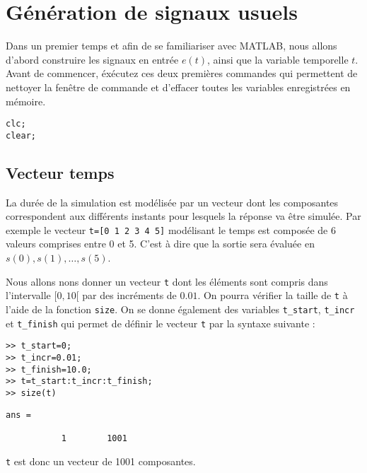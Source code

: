 \section{Génération de signaux usuels}
Dans un premier temps et afin de se familiariser avec MATLAB, nous 
allons d'abord construire les signaux en entrée $e(t)$, 
ainsi que la variable temporelle $t$.
Avant de commencer, éxécutez ces deux premières commandes qui permettent de 
nettoyer la fenêtre de commande et d'effacer toutes les variables 
enregistrées en mémoire.
\begin{verbatim}
clc;
clear;
\end{verbatim}
\subsection{Vecteur temps}
La durée de la simulation est modélisée par un vecteur dont les composantes 
correspondent aux différents instants pour lesquels la réponse va être 
simulée. Par exemple le vecteur \texttt{t=[0 1 2 3 4 5]} modélisant le temps est
composée de 6 valeurs comprises entre 0 et 5. 
C'est à dire que la sortie sera évaluée en $s(0),s(1),\ldots,s(5)$.

Nous allons nons donner un vecteur \texttt{t} dont les éléments sont 
compris dans l'intervalle $[0,10[$ par des incréments de $0.01$. 
On pourra vérifier la taille de \texttt{t} à l'aide de la 
fonction \texttt{size}. On se donne également des variables \texttt{t\_start}, 
\texttt{t\_incr} et \texttt{t\_finish} qui permet de définir le vecteur 
\texttt{t} par la syntaxe suivante :
\begin{verbatim}
>> t_start=0;
>> t_incr=0.01;
>> t_finish=10.0;
>> t=t_start:t_incr:t_finish;
>> size(t)
\end{verbatim}

\begin{verbatim}
ans =

           1        1001
\end{verbatim}
\texttt{t} est donc un vecteur de 1001 composantes.
